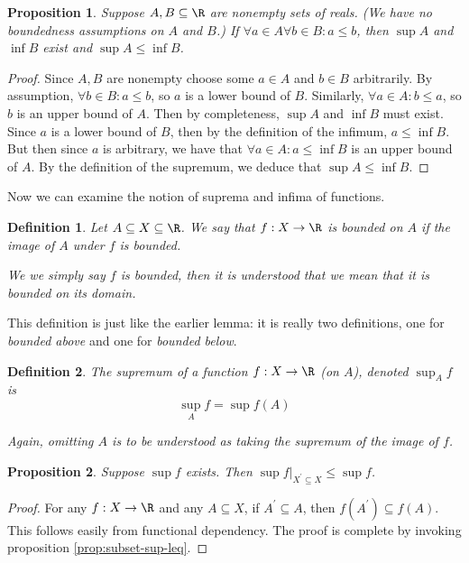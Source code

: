 \documentclass[letterpaper,11pt]{article}
\newtheorem{prop}{Proposition}
\newtheorem{defn}{Definition}
\begin{document}
\begin{prop}
  Suppose $A, B \subseteq \R$ are nonempty sets of reals. (We have no
  boundedness assumptions on $A$ and $B$.)
  If $\forall a \in A \forall b \in B: a \leq b$,
  then $\sup A$ and $\inf B$ exist and $\sup A \leq \inf B$.
\end{prop}

\begin{proof}
  Since $A, B$ are nonempty choose some $a \in A$ and $b \in B$ arbitrarily.
  By assumption, $\forall b \in B: a \leq b$, so $a$ is a lower bound of $B$.
  Similarly, $\forall a \in A: b \leq a$, so $b$ is an upper bound of $A$.
  Then by completeness, $\sup A$ and $\inf B$ must exist.
  Since $a$ is a lower bound of $B$, then by the definition of the infimum,
  $a \leq \inf B$.
  But then since $a$ is arbitrary, we have that
  $\forall a \in A:a \leq \inf B$ is an upper bound of $A$.
  By the definition of the supremum, we deduce that $\sup A \leq \inf B$.
\end{proof}

Now we can examine the notion of suprema and infima of functions.

\begin{defn}
  Let $A \subseteq X \subseteq \R$.
  We say that $f : X \to \R$ is \emph{bounded on $A$} if the image of $A$ under
  $f$ is bounded.

  We we simply say $f$ is bounded, then it is understood that we mean that it
  is bounded \emph{on its domain}.
\end{defn}

This definition is just like the earlier lemma: it is really two definitions,
one for \emph{bounded above} and one for \emph{bounded below}.

\begin{defn}
  The supremum of a function $f : X \to \R$ (on $A$), denoted $\sup_A f$ is
  \begin{equation*}
    \sup_A f = \sup f(A)
  \end{equation*}

  Again, omitting $A$ is to be understood as taking the supremum of the image
  of $f$.
\end{defn}

\begin{prop}
  Suppose $\sup f$ exists. Then $\sup f|_{X^\prime \subseteq X} \leq \sup f$.
\end{prop}

\begin{proof}
  For any $f : X \to \R$ and any $A \subseteq X$, if $A^\prime \subseteq A$,
  then $f(A^\prime) \subseteq f(A)$. This follows easily from functional
  dependency.
  The proof is complete by invoking proposition \ref{prop:subset-sup-leq}.
\end{proof}
\end{document}
